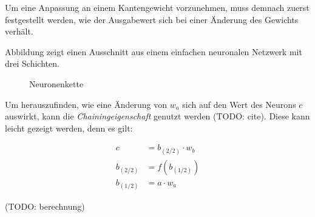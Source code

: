 Um eine Anpassung an einem Kantengewicht vorzunehmen, muss demnach zuerst
festgestellt werden, wie der Ausgabewert sich bei einer Änderung des Gewichts
verhält.

Abbildung zeigt einen Ausschnitt aus einem einfachen neuronalen Netzwerk
mit drei Schichten.

\begin{figure}[H]
    \centering
    \caption{Neuronenkette}
\end{figure}

Um herauszufinden, wie eine Änderung von $w_a$ sich auf den Wert des Neurons $c$
auswirkt, kann die \emph{Chainingeigenschaft} genutzt werden (TODO: cite).
Diese kann leicht gezeigt werden, denn es gilt:

\begin{align*}
    c         & = b_{(2/2)}\cdot w_b \\
    b_{(2/2)} & = f(b_{(1/2)})       \\
    b_{(1/2)} & = a\cdot w_a
\end{align*}

(TODO: berechnung)
